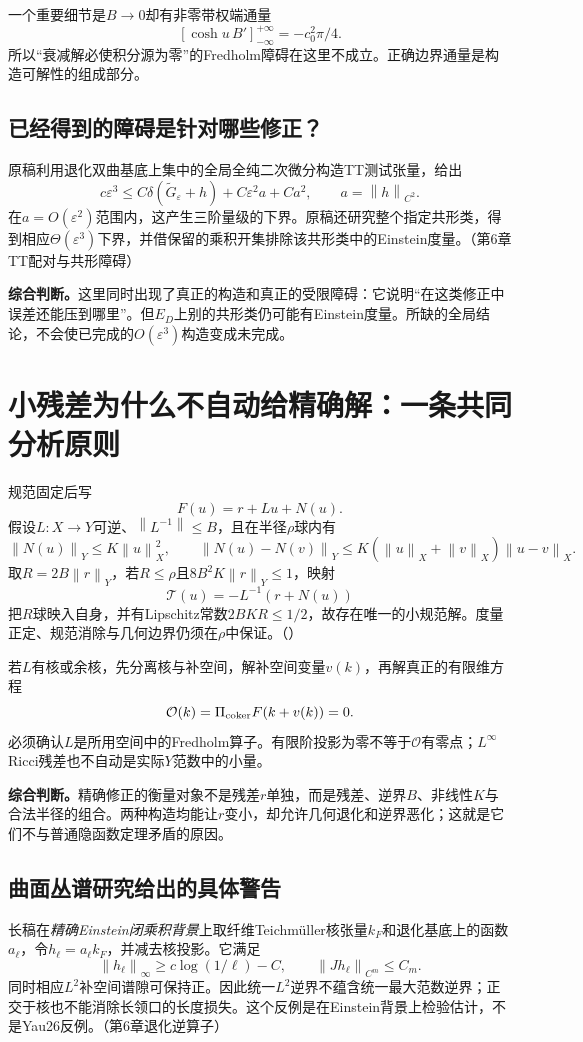 \documentclass[UTF8,fontset=fandol,zihao=-4]{ctexart}
\theoremstyle{research}
\newcommand{\norm}[1]{\left\|#1\right\|}
\numberwithin{equation}{section}
\begin{document}
一个重要细节是$B\to0$却有非零带权端通量
\[
[\cosh u\,B']_{-\infty}^{+\infty}=-c_0^2\pi/4.
\]
所以“衰减解必使积分源为零”的Fredholm障碍在这里不成立。正确边界通量是构造可解性的组成部分。

\subsection{已经得到的障碍是针对哪些修正？}
原稿利用退化双曲基底上集中的全局全纯二次微分构造TT测试张量，给出
\[
c\varepsilon^3\le C\delta(\widetilde G_\varepsilon+h)
+C\varepsilon^2a+Ca^2,\qquad a=\norm h_{C^2}.
\]
在$a=O(\varepsilon^2)$范围内，这产生三阶量级的下界。原稿还研究整个指定共形类，得到相应$\Theta(\varepsilon^3)$下界，并借保留的乘积开集排除该共形类中的Einstein度量。\cite{L}（第6章TT配对与共形障碍）

\textbf{综合判断。}这里同时出现了真正的构造和真正的受限障碍：它说明“在这类修正中误差还能压到哪里”。但$E_D$上别的共形类仍可能有Einstein度量。所缺的全局结论，不会使已完成的$O(\varepsilon^3)$构造变成未完成。

\section{小残差为什么不自动给精确解：一条共同分析原则}
规范固定后写
\[
F(u)=r+Lu+N(u).
\]
假设$L:X\to Y$可逆、$\norm{L^{-1}}\le B$，且在半径$\rho$球内有
\[
\norm{N(u)}_Y\le K\norm u_X^2,\qquad
\norm{N(u)-N(v)}_Y\le K(\norm u_X+\norm v_X)\norm{u-v}_X.
\]
取$R=2B\norm r_Y$，若$R\le\rho$且$8B^2K\norm r_Y\le1$，映射
\[
\mathcal T(u)=-L^{-1}(r+N(u))
\]
把$R$球映入自身，并有Lipschitz常数$2BKR\le1/2$，故存在唯一的小规范解。度量正定、规范消除与几何边界仍须在$\rho$中保证。\cite{F}（）

若$L$有核或余核，先分离核与补空间，解补空间变量$v(k)$，再解真正的有限维方程
\[
\mathcal O(k)=\Pi_{\rm coker}F(k+v(k))=0.
\]
必须确认$L$是所用空间中的Fredholm算子。有限阶投影为零不等于$\mathcal O$有零点；$L^\infty$ Ricci残差也不自动是实际$Y$范数中的小量。

\textbf{综合判断。}精确修正的衡量对象不是残差$r$单独，而是残差、逆界$B$、非线性$K$与合法半径的组合。两种构造均能让$r$变小，却允许几何退化和逆界恶化；这就是它们不与普通隐函数定理矛盾的原因。

\subsection{曲面丛谱研究给出的具体警告}
长稿在\emph{精确Einstein闭乘积背景}上取纤维Teichmüller核张量$k_F$和退化基底上的函数$a_\ell$，令$h_\ell=a_\ell k_F$，并减去核投影。它满足
\[
\norm{h_\ell}_\infty\ge c\log(1/\ell)-C,
\qquad\norm{Jh_\ell}_{C^m}\le C_m.
\]
同时相应$L^2$补空间谱隙可保持正。因此统一$L^2$逆界不蕴含统一最大范数逆界；正交于核也不能消除长领口的长度损失。这个反例是在Einstein背景上检验估计，不是Yau26反例。\cite{L}（第6章退化逆算子）
\end{document}
